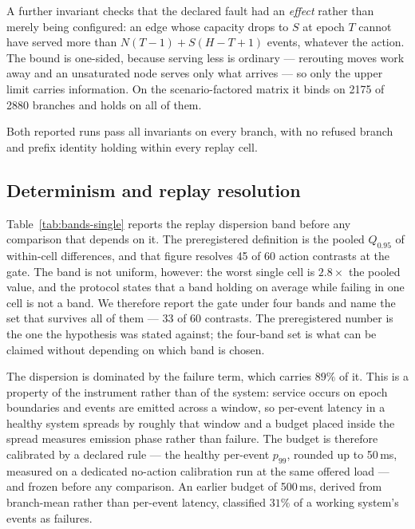 \documentclass[journal]{IEEEtran}
\begin{document}
A further invariant checks that the declared fault had an \emph{effect} rather
than merely being configured: an edge whose capacity drops to $S$ at epoch $T$
cannot have served more than $N(T-1) + S(H-T+1)$ events, whatever the action.
The bound is one-sided, because serving less is ordinary --- rerouting moves work
away and an unsaturated node serves only what arrives --- so only the upper limit
carries information. On the scenario-factored matrix it binds on 2175 of 2880
branches and holds on all of them.

Both reported runs pass all invariants on every branch, with no refused branch
and prefix identity holding within every replay cell.

\subsection{Determinism and replay resolution}
\label{sec:results-replay}



Table~\ref{tab:bands-single} reports the replay dispersion band before any
comparison that depends on it. The preregistered definition is the pooled
$Q_{0.95}$ of within-cell differences, and that figure resolves 45 of 60 action
contrasts at the gate. The band is not uniform, however: the worst single cell is
$2.8\times$ the pooled value, and the protocol states that a band holding on
average while failing in one cell is not a band. We therefore report the gate
under four bands and name the set that survives all of them --- 33 of 60
contrasts. The preregistered number is the one the hypothesis was stated against;
the four-band set is what can be claimed without depending on which band is
chosen.

The dispersion is dominated by the failure term, which carries $89\%$ of it.
This is a property of the instrument rather than of the system: service occurs on
epoch boundaries and events are emitted across a window, so per-event latency in
a healthy system spreads by roughly that window and a budget placed inside the
spread measures emission phase rather than failure. The budget is therefore
calibrated by a declared rule --- the healthy per-event $p_{99}$, rounded up to
50\,ms, measured on a dedicated no-action calibration run at the same offered
load --- and frozen before any comparison. An earlier budget of 500\,ms, derived
from branch-mean rather than per-event latency, classified $31\%$ of a working
system's events as failures.
\end{document}
